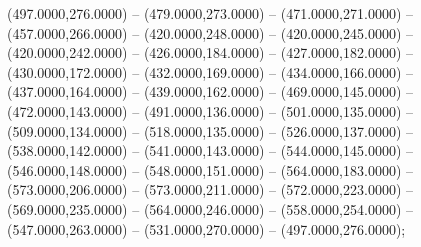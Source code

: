 \begin{scope}[shift={(-419.87,-133.87)}]
  \begin{scope}[draw=black,fill=c7793cb,line join=round,line width=0.208pt]
       (497.0000,276.0000) -- (479.0000,273.0000) --
        (471.0000,271.0000) -- (457.0000,266.0000) -- (420.0000,248.0000) --
        (420.0000,245.0000) -- (420.0000,242.0000) -- (426.0000,184.0000) --
        (427.0000,182.0000) -- (430.0000,172.0000) -- (432.0000,169.0000) --
        (434.0000,166.0000) -- (437.0000,164.0000) -- (439.0000,162.0000) --
        (469.0000,145.0000) -- (472.0000,143.0000) -- (491.0000,136.0000) --
        (501.0000,135.0000) -- (509.0000,134.0000) -- (518.0000,135.0000) --
        (526.0000,137.0000) -- (538.0000,142.0000) -- (541.0000,143.0000) --
        (544.0000,145.0000) -- (546.0000,148.0000) -- (548.0000,151.0000) --
        (564.0000,183.0000) -- (573.0000,206.0000) -- (573.0000,211.0000) --
        (572.0000,223.0000) -- (569.0000,235.0000) -- (564.0000,246.0000) --
        (558.0000,254.0000) -- (547.0000,263.0000) -- (531.0000,270.0000) --
        (497.0000,276.0000);
  \end{scope}
\end{scope}
\begin{scope}[shift={(-419.87,-133.87)},draw=cff0000,line width=0.800pt]
\end{scope}

